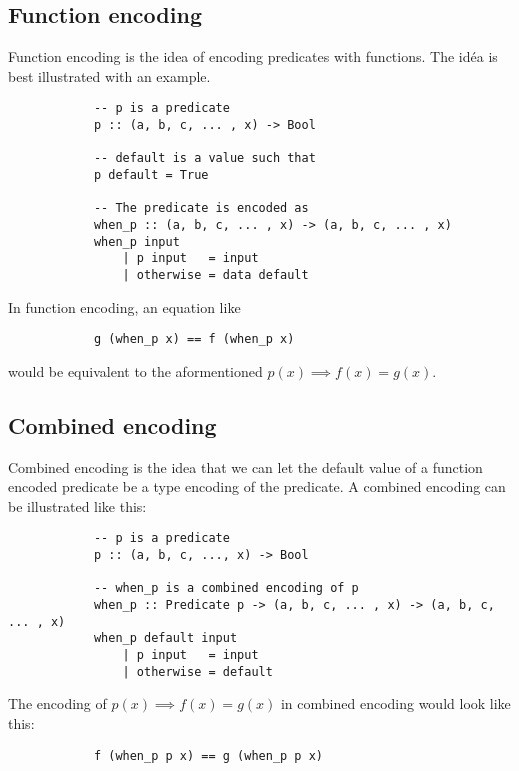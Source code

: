     \subsection{Function encoding}

        Function encoding is the idea of encoding 
        predicates with functions. The idéa is best
        illustrated with an example.
        \begin{verbatim}
            -- p is a predicate
            p :: (a, b, c, ... , x) -> Bool

            -- default is a value such that
            p default = True

            -- The predicate is encoded as
            when_p :: (a, b, c, ... , x) -> (a, b, c, ... , x)
            when_p input
                | p input   = input
                | otherwise = data default
        \end{verbatim}
        In function encoding, an equation like
        \begin{verbatim}
            g (when_p x) == f (when_p x)
        \end{verbatim}
        would be equivalent to the aformentioned $p(x) \implies f(x) = g(x)$.

    \subsection{Combined encoding}
        
        Combined encoding is the idea that we can let the
        default value of a function encoded predicate be a type
        encoding of the predicate. A combined encoding can be illustrated
        like this:
        \begin{verbatim}
            -- p is a predicate
            p :: (a, b, c, ..., x) -> Bool  

            -- when_p is a combined encoding of p
            when_p :: Predicate p -> (a, b, c, ... , x) -> (a, b, c, ... , x)
            when_p default input
                | p input   = input
                | otherwise = default
        \end{verbatim}
        The encoding of $p(x) \implies f(x) = g(x)$ in combined encoding would look like
        this:
        \begin{verbatim}
            f (when_p p x) == g (when_p p x)
        \end{verbatim}
